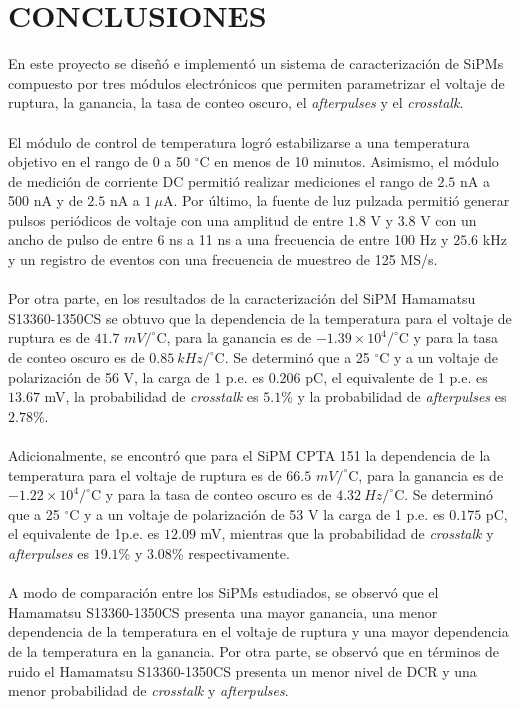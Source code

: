 \chapter{CONCLUSIONES}
\label{Cap:Conclusiones}
En este proyecto se diseñó e implementó un sistema de caracterización de SiPMs compuesto por tres módulos electrónicos que permiten parametrizar el voltaje de ruptura, la ganancia, la tasa de conteo oscuro, el \textit{afterpulses} y el \textit{crosstalk}.\\ \\
El módulo de control de temperatura logró estabilizarse a una temperatura objetivo en el rango de 0 a 50 $^\circ$C en menos de 10 minutos. Asimismo, el módulo de medición de corriente DC permitió realizar mediciones  el rango de  $2.5$ nA a 500 nA y de $2.5$ nA a $1~\mu$A. Por último, la fuente de luz pulzada permitió generar pulsos periódicos de voltaje con una amplitud de entre $1.8$ V y $3.8$ V con un ancho de pulso de entre 6 ns a 11 ns a una frecuencia de entre 100 Hz y $25.6$ kHz y un registro de eventos con una frecuencia de muestreo de 125 MS/s.\\ \\
Por otra parte, en los resultados de la caracterización del SiPM Hamamatsu S13360-1350CS se obtuvo  que la dependencia de la temperatura para el voltaje de ruptura es de $41.7$ $mV/^\circ$C, para la ganancia es de $-1.39\times10^4/^\circ$C y para la tasa de conteo oscuro es de $0.85~kHz /^\circ$C. Se determinó que a 25 $^\circ$C y a un voltaje de polarización de 56 V, la carga de 1 p.e. es $0.206$ pC, el equivalente de 1 p.e. es $13.67$ mV, la probabilidad de \textit{crosstalk} es $5.1$\% y la probabilidad de \textit{afterpulses} es $2.78$\%.\\ \\
Adicionalmente, se encontró que para el SiPM CPTA 151 la dependencia de la temperatura para el voltaje de ruptura es de $66.5$ $mV/^\circ$C, para la ganancia es de $-1.22\times10^4/^\circ$C y para la tasa de conteo oscuro es de $ 4.32~Hz /^\circ$C. Se determinó que a 25 $^\circ$C y a un voltaje de polarización de 53 V la carga de 1 p.e. es $0.175$ pC, el equivalente de 1p.e. es $12.09$ mV, mientras que la probabilidad de \textit{crosstalk} y  \textit{afterpulses} es $19.1$\% y $3.08$\% respectivamente.\\ \\
A modo de comparación entre los SiPMs estudiados, se observó que el Hamamatsu S13360-1350CS presenta una mayor ganancia, una menor dependencia de la temperatura en el voltaje de ruptura y una mayor dependencia de la temperatura en la ganancia. Por otra parte, se observó que en términos de ruido el  Hamamatsu S13360-1350CS presenta un menor nivel de DCR y una menor probabilidad de \textit{crosstalk} y \textit{afterpulses}.\\ \\  
